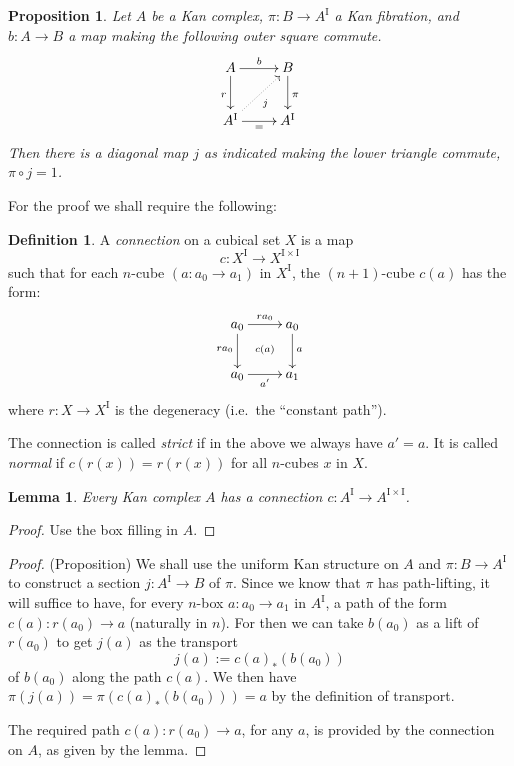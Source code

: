 \documentclass[12pt]{article}
\newcommand{\I}{\ensuremath{\mathrm{I}}}
\newcommand{\pA}{\ensuremath{A^\I}}
\newtheorem{proposition}[theorem]{Proposition}
\newtheorem{lemma}[theorem]{Lemma}
\theoremstyle{remark}
\theoremstyle{definition}
\newtheorem{definition}[theorem]{Definition}
\begin{document}
\begin{proposition}\label{prop:liftingnotnormal}
Let $A$ be a Kan complex, $\pi : B \to A^\I$ a Kan fibration, and $b : A\to B$ a map making the following outer square commute.
\begin{equation}\label{diagram:IdElim}
\xymatrix{
A \ar[d]_{r} \ar[r]^{b} & \ar[d]^{\pi} B \\
A^\I \ar@{..>}[ru]_{j} \ar[r]_{=} & A^\I
}
\end{equation}
Then there is a diagonal map $j$ as indicated making the lower triangle commute, $\pi\circ j = 1$.
\end{proposition}

For the proof we shall require the following:

\begin{definition}
A \emph{connection} on a cubical set $X$ is a map
\[
c : X^\I \to X^{\I\times\I}
\]
such that for each $n$-cube $(a: a_0\to a_1)$ in $X^\I$, the $(n+1)$-cube $c(a)$ has the form:
\begin{equation}\label{diagram:connection}
\xymatrix{
a_0 \ar[d]_{ra_0} \ar[r]^{ra_0} & \ar[d]^{a} a_0 \\
a_0 \ar@{}[ru]|{c(a)} \ar[r]_{a'} & a_1
}
\end{equation}
where $r : X\to X^\I$ is the degeneracy (i.e.\ the ``constant path'').

The connection is called \emph{strict} if in the above we always have $a'=a$.  It is called \emph{normal} if $c(r(x)) = r(r(x))$ for all $n$-cubes $x$ in $X$.
\end{definition}

\begin{lemma}
Every Kan complex  $A$ has a connection $c : A^\I \to A^{\I\times\I}$.
\end{lemma}
\begin{proof}
Use the box filling in $A$.
\end{proof}

\begin{proof} (Proposition)
We shall use the uniform Kan structure on $A$ and $\pi:B\to A^\I$ to construct a section $j:A^\I \to B$ of $\pi$.  Since we know that  $\pi$ has path-lifting, it will suffice to have, for every $n$-box $a : a_0 \to a_1$ in $\pA$, a path of the form $c(a) : r(a_0) \to a$ (naturally in $n$).  For then we can take $b(a_0)$ as a lift of $r(a_0)$ to get $j(a)$ as the transport
\[
j(a) := c(a)_*(b(a_0))
\]
of $b(a_0)$ along the path $c(a)$.  We then have $\pi(j(a)) = \pi(c(a)_*(b(a_0))) = a$ by the definition of transport.  

The required path $c(a) : r(a_0) \to a$, for any $a$, is provided by the connection on $A$, as given by the lemma.
\end{proof}
\end{document}
